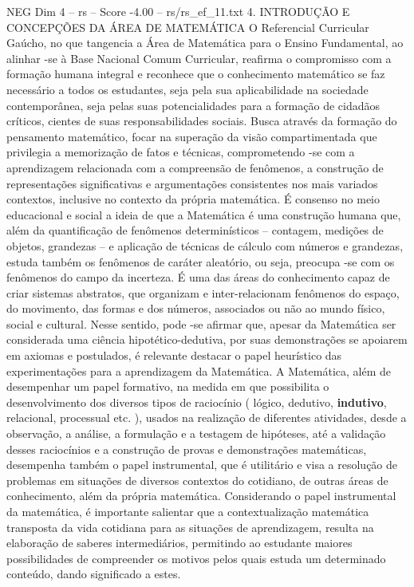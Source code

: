 \begin{textsample}{NEG Dim 4 – rs – Score -4.00 – rs/rs\_ef\_11.txt}  \label{ex:f4_neg_191}
4.
INTRODUÇÃO E CONCEPÇÕES DA ÁREA DE MATEMÁTICA O Referencial Curricular Gaúcho, no que tangencia a Área de Matemática para o Ensino Fundamental, ao alinhar -se à Base Nacional Comum Curricular, reafirma o compromisso com a formação humana integral e reconhece que o conhecimento matemático se faz necessário a todos os estudantes, seja pela sua aplicabilidade na sociedade contemporânea, seja pelas suas potencialidades para a formação de cidadãos críticos, cientes de suas responsabilidades sociais.
Busca através da formação do pensamento matemático, focar na superação da visão compartimentada que privilegia a memorização de fatos e técnicas, comprometendo -se com a aprendizagem relacionada com a compreensão de fenômenos, a construção de representações significativas e argumentações consistentes nos mais variados contextos, inclusive no contexto da própria matemática.
É consenso no meio educacional e social a ideia de que a Matemática é uma construção humana que, além da quantificação de fenômenos determinísticos – contagem, medições de objetos, grandezas – e aplicação de técnicas de cálculo com números e grandezas, estuda também os fenômenos de caráter aleatório, ou seja, preocupa -se com os fenômenos do campo da incerteza.
É uma das áreas do conhecimento capaz de criar sistemas abstratos, que organizam e inter-relacionam fenômenos do espaço, do movimento, das formas e dos números, associados ou não ao mundo físico, social e cultural.
Nesse sentido, pode -se afirmar que, apesar da Matemática ser considerada uma ciência hipotético-dedutiva, por suas demonstrações se apoiarem em axiomas e postulados, é relevante destacar o papel heurístico das experimentações para a aprendizagem da Matemática.
A Matemática, além de desempenhar um papel formativo, na medida em que possibilita o desenvolvimento dos diversos tipos de raciocínio ( lógico, dedutivo, \textbf{indutivo}, relacional, processual etc. ), usados na realização de diferentes atividades, desde a observação, a análise, a formulação e a testagem de hipóteses, até a validação desses raciocínios e a construção de provas e demonstrações matemáticas, desempenha também o papel instrumental, que é utilitário e visa a resolução de problemas em situações de diversos contextos do cotidiano, de outras áreas de conhecimento, além da própria matemática.
Considerando o papel instrumental da matemática, é importante salientar que a contextualização matemática transposta da vida cotidiana para as situações de aprendizagem, resulta na elaboração de saberes intermediários, permitindo ao estudante maiores possibilidades de compreender os motivos pelos quais estuda um determinado conteúdo, dando significado a estes.

\end{textsample}
